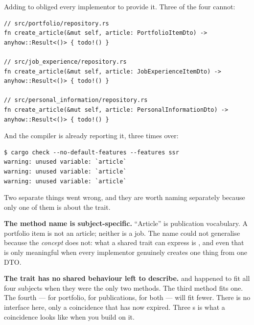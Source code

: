 \begin{verified}
Adding  to  obliged every implementor to provide it.
Three of the four cannot:
\begin{lstlisting}[style=rs]
// src/portfolio/repository.rs
fn create_article(&mut self, article: PortfolioItemDto) -> anyhow::Result<()> { todo!() }

// src/job_experience/repository.rs
fn create_article(&mut self, article: JobExperienceItemDto) -> anyhow::Result<()> { todo!() }

// src/personal_information/repository.rs
fn create_article(&mut self, article: PersonalInformationDto) -> anyhow::Result<()> { todo!() }
\end{lstlisting}
And the compiler is already reporting it, three times over:
\begin{lstlisting}[style=out]
$ cargo check --no-default-features --features ssr
warning: unused variable: `article`
warning: unused variable: `article`
warning: unused variable: `article`
\end{lstlisting}
\end{verified}

Two separate things went wrong, and they are worth naming separately because only one of them is
about the trait.

\textbf{The method name is subject-specific.} ``Article'' is publication vocabulary. A portfolio item
is not an article; neither is a job. The name could not generalise because the \emph{concept} does
not: what a shared trait can express is , and even that is only meaningful when every
implementor genuinely creates one thing from one DTO.

\textbf{The trait has no shared behaviour left to describe.}  and 
happened to fit all four subjects when they were the only two methods. The third method fits one.
The fourth ---  for portfolio,  for publications,
 for both --- will fit fewer. There is no interface here, only a coincidence that has
now expired. Three s is what a coincidence looks like when you build on it.

